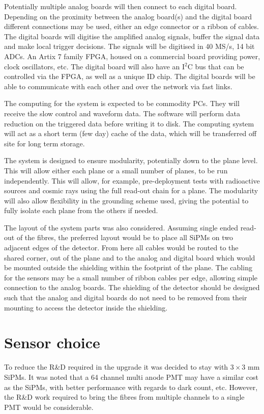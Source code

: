 \documentclass[a4paper]{article}
\begin{document}
Potentially multiple analog boards will then connect to each digital board.
Depending on the proximity between the analog board(s) and the digital board different connections may be used, either an edge connector or a ribbon of cables.
The digital boards will digitise the amplified analog signals, buffer the signal data and make local trigger decisions.
The signals will be digitised in 40 MS/s, 14 bit ADCs.
An Artix 7 family FPGA, housed on a commercial board providing power, clock oscillators, etc.
The digital board will also have an I$^2$C bus that can be controlled via the FPGA, as well as a unique ID chip.
The digital boards will be able to communicate with each other and over the network via fast links.

The computing for the system is expected to be commodity PCs.
They will receive the slow control and waveform data.
The software will perform data reduction on the triggered data before writing it to disk.
The computing system will act as a short term (few day) cache of the data, which will be transferred off site for long term storage.

The system is designed to ensure modularity, potentially down to the plane level.
This will allow either each plane or a small number of planes, to be run independently.
This will allow, for example, pre-deployment tests with radioactive sources and cosmic rays using the full read-out chain for a plane.
The modularity will also allow flexibility in the grounding scheme used, giving the potential to fully isolate each plane from the others if needed.

The layout of the system parts was also considered.
Assuming single ended read-out of the fibres, the preferred layout would be to place all SiPMs on two adjacent edges of the detector.
From here all cables would be routed to the shared corner, out of the plane and to the analog and digital board which would be mounted outside the shielding within the footprint of the plane.
The cabling for the sensors may be a small number of ribbon cables per edge, allowing simple connection to the analog boards.
The shielding of the detector should be designed such that the analog and digital boards do not need to be removed from their mounting to access the detector inside the shielding.

\section{Sensor choice}

To reduce the R\&D required in the upgrade it was decided to stay with $3\times3$ mm SiPMs.
It was noted that a 64 channel multi anode PMT may have a similar cost as the SiPMs, with better performance with regards to dark count, etc.
However, the R\&D work required to bring the fibres from multiple channels to a single PMT would be considerable.
\end{document}
